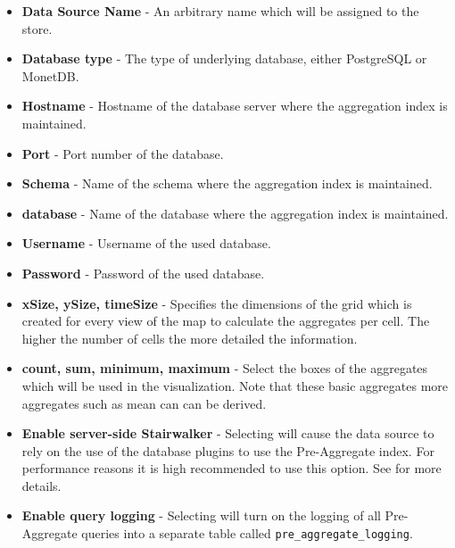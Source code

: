 \begin{itemize}\label{list:manditory}
	\item \textbf{Data Source Name} - An arbitrary name which will be assigned to the store.
	\item \textbf{Database type} - The type of underlying database, either PostgreSQL or MonetDB.
	\item \textbf{Hostname} - Hostname of the database server where the aggregation index is maintained.
	\item \textbf{Port} - Port number of the database.
	\item \textbf{Schema} - Name of the schema where the aggregation index is maintained.
	\item \textbf{database} - Name of the database where the aggregation index is maintained.
	\item \textbf{Username} - Username of the used database.
	\item \textbf{Password} - Password of the used database.
	\item \textbf{xSize, ySize, timeSize} - Specifies the dimensions of the grid which is created for every view of the map to calculate the aggregates per cell. The higher the number of cells the more detailed the information. \\
	\item \textbf{count, sum, minimum, maximum} - Select the boxes of the aggregates which will be used in the visualization. Note that these basic aggregates more aggregates such as mean can can be derived.
	\item \textbf{Enable server-side Stairwalker} - Selecting will cause the data source to rely on the use of the database plugins to use the Pre-Aggregate index. For performance reasons it is high recommended to use this option. See  for more details.
	\item \textbf{Enable query logging} - Selecting will turn on the logging of all Pre-Aggregate queries into a separate table called \lstinline|pre_aggregate_logging|.
\end{itemize}